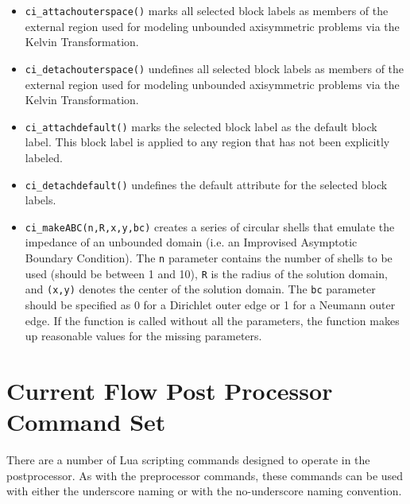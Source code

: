 \begin{itemize}
\item{\tt ci\_attachouterspace()} marks all
selected block labels as members of the external region used for
modeling unbounded axisymmetric problems via the Kelvin
Transformation.

\item{\tt ci\_detachouterspace()} undefines all selected block labels
as members of the external region used for modeling unbounded axisymmetric
problems via the Kelvin Transformation.

\item{\tt ci\_attachdefault()} marks the
selected block label as the default block label.  This block label
is applied to any region that has not been explicitly labeled.

\item{\tt ci\_detachdefault()} undefines the default
attribute for the selected block labels.

\item{\tt ci\_makeABC(n,R,x,y,bc)} creates a series of circular shells that emulate the
impedance of an unbounded domain (i.e. an Improvised Asymptotic Boundary
Condition).  The {\tt n} parameter contains the number of shells to be used
(should be between 1 and 10), {\tt R} is the radius of the solution domain, and
{\tt (x,y)} denotes the center of the solution domain.  The {\tt bc} parameter should
be specified as 0 for a Dirichlet outer edge or 1 for a Neumann outer edge.
If the function is called without all the parameters, the function makes up
reasonable values for the missing parameters. 

\end{itemize}

\section{Current Flow Post Processor Command Set}

There are a number of Lua scripting commands designed to operate in
the postprocessor. As with the preprocessor commands, these
commands can be used with either the underscore naming or with the
no-underscore naming convention.

